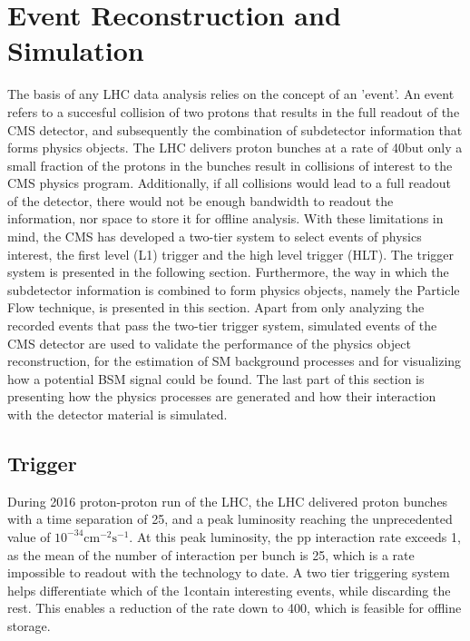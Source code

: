 \chapter{Event Reconstruction and Simulation}
The basis of any LHC data analysis relies on the concept of an 'event'. 
An event refers to a succesful collision of two protons that results in the full readout of the CMS detector, and subsequently the combination of subdetector information that forms physics objects. 
The LHC delivers proton bunches at a rate of 40\MHz but only a small fraction of the protons in the bunches result in collisions of interest to the CMS physics program.
Additionally, if all collisions would lead to a full readout of the detector, there would not be enough bandwidth to readout the information, nor space to store it for offline analysis. 
With these limitations in mind, the CMS has developed a two-tier system to select events of physics interest, the first level (L1) trigger and the high level trigger (HLT). 
The trigger system is presented in the following section. 
Furthermore, the way in which the subdetector information is combined to form physics objects, namely the Particle Flow technique, is presented in this section. 
Apart from only analyzing the recorded events that pass the two-tier trigger system, simulated events of the CMS detector are used to validate the performance of the physics object reconstruction, for the estimation of SM background processes and for visualizing how a potential BSM signal could be found. 
The last part of this section is presenting how the physics processes are generated and how their interaction with the detector material is simulated. 
\section{Trigger}
\label{trigger}
During 2016 proton-proton run of the LHC, the LHC delivered proton bunches with a time separation of 25\ns, and a peak luminosity reaching the unprecedented value of $10^{-34}\mathrm{cm}^{-2}\mathrm{s}^{-1}$. 
At this peak luminosity, the pp interaction rate exceeds 1\GHz, as the mean of the number of interaction per bunch is 25, which is a rate impossible to readout with the technology to date.   
A two tier triggering system helps differentiate which of the 1\GHz contain interesting events, while discarding the rest. 
This enables a reduction of the rate down to 400\Hz, which is feasible for offline storage.   
